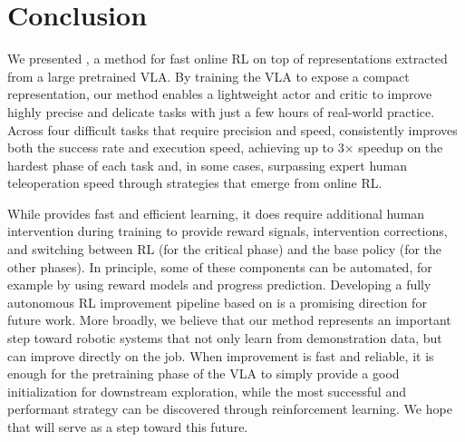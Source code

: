 \section{Conclusion}
\label{sec:conclusion}

We presented \MethodName{}, a method for fast online RL on top of representations extracted from a large pretrained VLA. By training the VLA to expose a compact representation, our method enables a lightweight actor and critic to improve highly precise and delicate tasks with just a few hours of real-world practice. Across four difficult tasks that require precision and speed, \MethodName{} consistently improves both the success rate and execution speed, achieving up to 3× speedup on the hardest phase of each task and, in some cases, surpassing expert human teleoperation speed through strategies that emerge from online RL.


While \MethodName{} provides fast and efficient learning, it does require additional human intervention during training to provide reward signals, intervention corrections, and switching between RL (for the critical phase) and the base policy (for the other phases). In principle, some of these components can be automated, for example by using reward models and progress prediction. Developing a fully autonomous RL improvement pipeline based on \MethodName{} is a promising direction for future work. More broadly, we believe that our method represents an important step toward robotic systems that not only learn from demonstration data, but can improve directly on the job. When improvement is fast and reliable, it is enough for the pretraining phase of the VLA to simply provide a good initialization for downstream exploration, while the most successful and performant strategy can be discovered through reinforcement learning. We hope that \MethodName{} will serve as a step toward this future.

